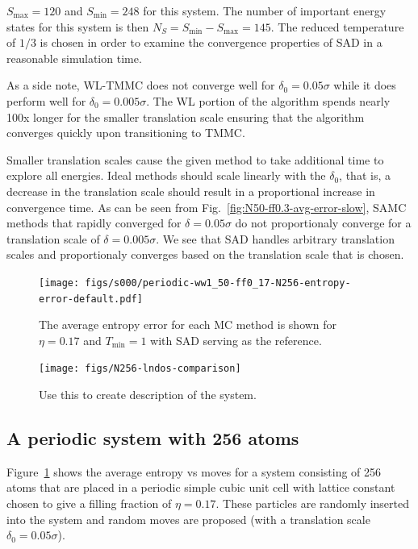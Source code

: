 \documentclass[letterpaper,twocolumn,amsmath,amssymb,pre,aps,10pt]{revtex4-1}
\begin{document}
{\color{red}
$S_{\max} = 120$ and $S_{\min} = 248$ for this system.  The number of
important energy states for this system is then $N_S = S_{\min} - S_{\max} = 145$.
The reduced temperature of $1/3$ is chosen in order to examine the convergence
properties of SAD in a reasonable simulation time.

As a side note, WL-TMMC does not converge well for $\delta_0 = 0.05\sigma$ while
it does perform well for $\delta_0 = 0.005\sigma$. The WL portion of the algorithm
spends nearly 100x longer for the smaller translation scale ensuring that the algorithm
converges quickly upon transitioning to TMMC.
}

Smaller translation
scales cause the given method to take additional time to explore all
energies. Ideal methods should scale linearly with the $\delta_0$, that
is, a decrease in the translation scale should result in a proportional
increase in convergence time. As can be seen from
Fig.~\ref{fig:N50-ff0.3-avg-error-slow}, SAMC methods that rapidly
converged for $\delta = 0.05\sigma$ do not proportionaly converge for a
translation scale of $\delta = 0.005\sigma$. We see that SAD handles
arbitrary translation scales and proportionaly converges based on the
translation scale that is chosen.

\begin{figure}
\texttt{[image: figs/s000/periodic-ww1\_50-ff0\_17-N256-entropy-error-default.pdf]}
  \caption{The average entropy error for each MC method is shown for $\eta = 0.17$ and $T_{\min} = 1$ with
  SAD serving as the reference.}\label{fig:n256}
\end{figure}
\begin{figure}
  \texttt{[image: figs/N256-lndos-comparison]}
  \caption{Use this to create description of the system.}\label{fig:n256-lndos-comparison}
\end{figure}


\subsection{A periodic system with 256 atoms}

Figure~\ref{fig:n256} shows the average entropy vs moves for a system
consisting of 256 atoms that are placed in a periodic simple cubic unit
cell with lattice constant chosen to give a filling fraction of $\eta =
0.17$.   These particles are randomly inserted into the system and
random moves are proposed (with a translation scale $\delta_0 =
0.05\sigma$).
\end{document}

